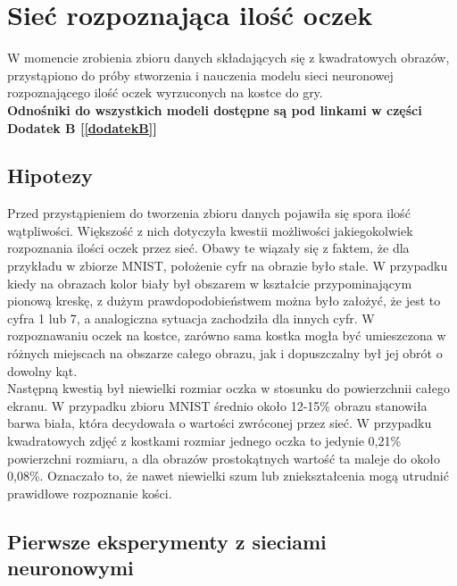 
\chapter{Sieć rozpoznająca ilość oczek}
W momencie zrobienia zbioru danych składających się z kwadratowych obrazów, przystąpiono
do próby stworzenia i nauczenia modelu sieci neuronowej rozpoznającego ilość oczek
wyrzuconych na kostce do gry.\\
\textbf{Odnośniki do wszystkich modeli dostępne są pod linkami w części Dodatek B [\ref{dodatekB}] }

\section{Hipotezy}
Przed przystąpieniem do tworzenia zbioru danych pojawiła się spora ilość wątpliwości.
Większość z nich dotyczyła kwestii możliwości jakiegokolwiek rozpoznania ilości oczek
przez sieć. Obawy te wiązały się z faktem, że dla przykładu
w zbiorze MNIST, położenie cyfr na obrazie było stałe. W przypadku kiedy na obrazach
kolor biały był obszarem w kształcie przypominającym pionową kreskę, z dużym
prawdopodobieństwem można było założyć, że jest to cyfra 1 lub 7, a analogiczna
sytuacja zachodziła dla innych cyfr. W rozpoznawaniu oczek na kostce, zarówno sama
kostka mogła być umieszczona w różnych miejscach na obszarze całego obrazu, jak i
dopuszczalny był jej obrót o dowolny kąt.\\
Następną kwestią był niewielki rozmiar oczka w stosunku do powierzchnii całego ekranu.
W przypadku zbioru MNIST średnio około 12-15\% obrazu stanowiła barwa biała, która
decydowała o wartości zwróconej przez sieć. W przypadku kwadratowych zdjęć z kostkami rozmiar jednego oczka to jedynie 0,21\% powierzchni rozmiaru, a dla obrazów prostokątnych
wartość ta maleje do około 0,08\%. Oznaczało to, że nawet niewielki szum lub
zniekształcenia mogą utrudnić prawidłowe rozpoznanie kości.

\section{Pierwsze eksperymenty z sieciami neuronowymi}
